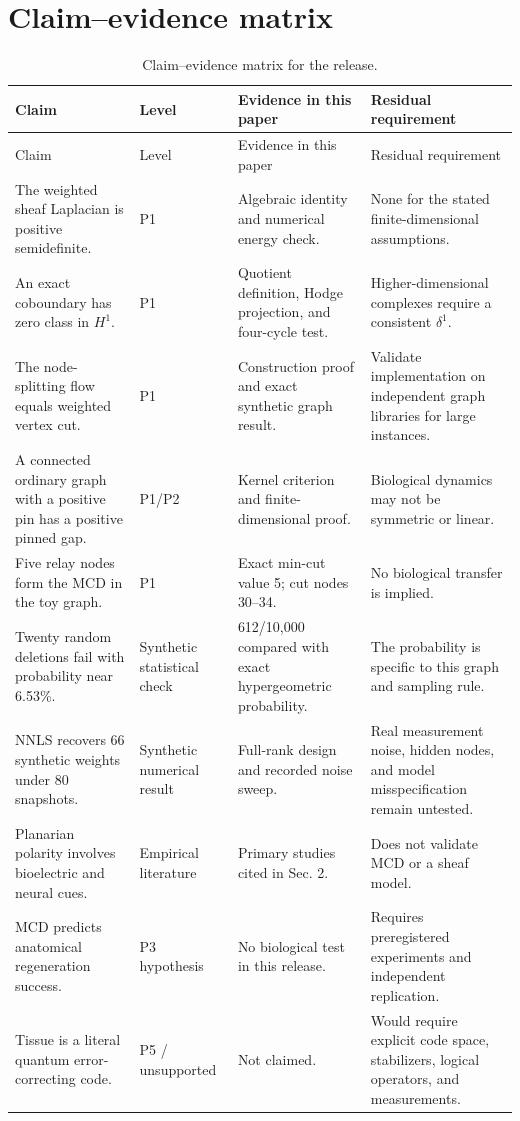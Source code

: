 \documentclass[12pt,a4paper]{article}
\begin{document}
\section{Claim--evidence matrix}
\setlength{\tabcolsep}{3pt}
\footnotesize
\begin{longtable}{@{}p{}p{}p{}p{}@{}}
\caption{Claim--evidence matrix for the release.}\label{tab:claims}\\
\toprule
Claim & Level & Evidence in this paper & Residual requirement\\
\midrule
\endfirsthead
\toprule
Claim & Level & Evidence in this paper & Residual requirement\\
\midrule
\endhead
The weighted sheaf Laplacian is positive semidefinite. & P1 & Algebraic identity and numerical energy check. & None for the stated finite-dimensional assumptions.\\
An exact coboundary has zero class in \(H^1\). & P1 & Quotient definition, Hodge projection, and four-cycle test. & Higher-dimensional complexes require a consistent \(\delta^1\).\\
The node-splitting flow equals weighted vertex cut. & P1 & Construction proof and exact synthetic graph result. & Validate implementation on independent graph libraries for large instances.\\
A connected ordinary graph with a positive pin has a positive pinned gap. & P1/P2 & Kernel criterion and finite-dimensional proof. & Biological dynamics may not be symmetric or linear.\\
Five relay nodes form the MCD in the toy graph. & P1 & Exact min-cut value 5; cut nodes 30--34. & No biological transfer is implied.\\
Twenty random deletions fail with probability near 6.53\%. & Synthetic statistical check & 612/10,000 compared with exact hypergeometric probability. & The probability is specific to this graph and sampling rule.\\
NNLS recovers 66 synthetic weights under 80 snapshots. & Synthetic numerical result & Full-rank design and recorded noise sweep. & Real measurement noise, hidden nodes, and model misspecification remain untested.\\
Planarian polarity involves bioelectric and neural cues. & Empirical literature & Primary studies cited in Sec. 2. & Does not validate MCD or a sheaf model.\\
MCD predicts anatomical regeneration success. & P3 hypothesis & No biological test in this release. & Requires preregistered experiments and independent replication.\\
Tissue is a literal quantum error-correcting code. & P5 / unsupported & Not claimed. & Would require explicit code space, stabilizers, logical operators, and measurements.\\
\bottomrule
\end{longtable}
\normalsize
\setlength{\tabcolsep}{6pt}
\end{document}
